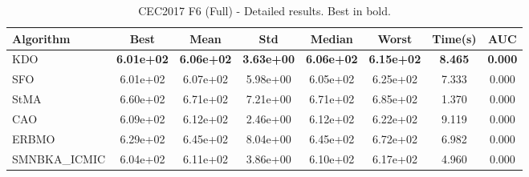 \begin{table}[H]
\centering\small
\caption{CEC2017 F6 (Full) - Detailed results. Best in bold.}
\label{tab:cec2017_F6}
\begin{tabular}{lccccccc}
\toprule
\textbf{Algorithm} & \textbf{Best} & \textbf{Mean} & \textbf{Std} & \textbf{Median} & \textbf{Worst} & \textbf{Time(s)} & \textbf{AUC} \\
\midrule
KDO & \textbf{6.01e+02} & \textbf{6.06e+02} & \textbf{3.63e+00} & \textbf{6.06e+02} & \textbf{6.15e+02} & \textbf{8.465} & \textbf{0.000} \\
SFO & 6.01e+02 & 6.07e+02 & 5.98e+00 & 6.05e+02 & 6.25e+02 & 7.333 & 0.000 \\
StMA & 6.60e+02 & 6.71e+02 & 7.21e+00 & 6.71e+02 & 6.85e+02 & 1.370 & 0.000 \\
CAO & 6.09e+02 & 6.12e+02 & 2.46e+00 & 6.12e+02 & 6.22e+02 & 9.119 & 0.000 \\
ERBMO & 6.29e+02 & 6.45e+02 & 8.04e+00 & 6.45e+02 & 6.72e+02 & 6.982 & 0.000 \\
SMNBKA_ICMIC & 6.04e+02 & 6.11e+02 & 3.86e+00 & 6.10e+02 & 6.17e+02 & 4.960 & 0.000 \\
\bottomrule
\end{tabular}
\end{table}
